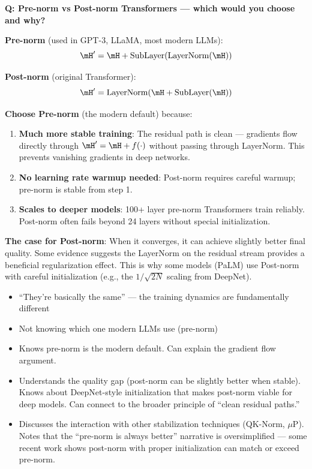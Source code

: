\begin{interviewq}
\textbf{Q: Pre-norm vs Post-norm Transformers --- which would you choose and why?}

 \quad {} \quad \badgefreq{\freqmed}

\stronganswer

\textbf{Pre-norm} (used in GPT-3, LLaMA, most modern LLMs):
\[\mH' = \mH + \text{SubLayer}(\text{LayerNorm}(\mH))\]

\textbf{Post-norm} (original Transformer):
\[\mH' = \text{LayerNorm}(\mH + \text{SubLayer}(\mH))\]

\textbf{Choose Pre-norm} (the modern default) because:
\begin{enumerate}
    \item \textbf{Much more stable training}: The residual path is clean --- gradients flow directly through $\mH' = \mH + f(\cdot)$ without passing through LayerNorm. This prevents vanishing gradients in deep networks.
    \item \textbf{No learning rate warmup needed}: Post-norm requires careful warmup; pre-norm is stable from step 1.
    \item \textbf{Scales to deeper models}: 100+ layer pre-norm Transformers train reliably. Post-norm often fails beyond 24 layers without special initialization.
\end{enumerate}

\textbf{The case for Post-norm}: When it converges, it can achieve slightly better final quality. Some evidence suggests the LayerNorm on the residual stream provides a beneficial regularization effect. This is why some models (PaLM) use Post-norm with careful initialization (e.g., the $1/\sqrt{2N}$ scaling from DeepNet).

\redflags
\begin{itemize}
    \item ``They're basically the same'' --- the training dynamics are fundamentally different
    \item Not knowing which one modern LLMs use (pre-norm)
\end{itemize}


\goodgreat
\begin{itemize}
    \item {} Knows pre-norm is the modern default. Can explain the gradient flow argument.
    \item {} Understands the quality gap (post-norm can be slightly better when stable). Knows about DeepNet-style initialization that makes post-norm viable for deep models. Can connect to the broader principle of ``clean residual paths.''
    \item {} Discusses the interaction with other stabilization techniques (QK-Norm, $\mu$P). Notes that the ``pre-norm is always better'' narrative is oversimplified --- some recent work shows post-norm with proper initialization can match or exceed pre-norm.
\end{itemize}


\end{interviewq}
